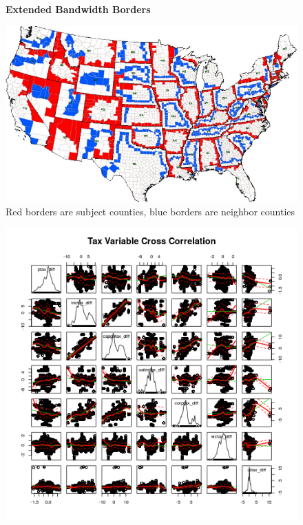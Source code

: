 \documentclass[12pt,a4paper]{article}
\begin{document}
\begin{figure}[h]
    \centering
    \textbf{Extended Bandwidth Borders}\par\medskip
    \includegraphics[scale = 0.5]{../analysis/output/eb_picture}
    \caption{Red borders are subject counties, blue borders are neighbor counties}
\end{figure}



\begin{figure}[h]\label{pairs}
    \centering
    \includegraphics[scale = 0.5]{../analysis/output/_--_pairs}
\end{figure}
\end{document}
